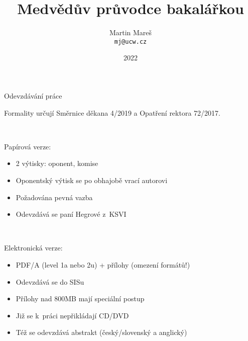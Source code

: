 \documentclass{beamer}
\title[Medvědův průvodce bakalářkou]{Medvědův průvodce bakalářkou}
\author[Martin Mareš]{Martin Mareš\\\texttt{mj@ucw.cz}}
\institute{Katedra Aplikované Matematiky\\MFF UK Praha}
\date{2022}
\begin{document}

\begin{frame}
\titlepage
\end{frame}

\begin{frame}{Odevzdávání práce}

Formality určují Směrnice děkana 4/2019
a Opatření rektora 72/2017.

~

Papírová verze:

\begin{itemize}
\item 2 výtisky: oponent, komise
\item Oponentský výtisk se po obhajobě vrací autorovi
\item Požadována pevná vazba
\item Odevzdává se paní Hegrové z~KSVI
\end{itemize}

~

Elektronická verze:

\begin{itemize}
\item PDF/A (level 1a nebo 2u) + přílohy (omezení formátů!)
\item Odevzdává se do SISu
\item Přílohy nad 800\thinspace{}MB mají speciální postup
\item Již se k~práci nepřikládají CD/DVD
\item Též se odevzdává abstrakt (český/slovenský a anglický)
\end{itemize}

\end{frame}
\end{document}
